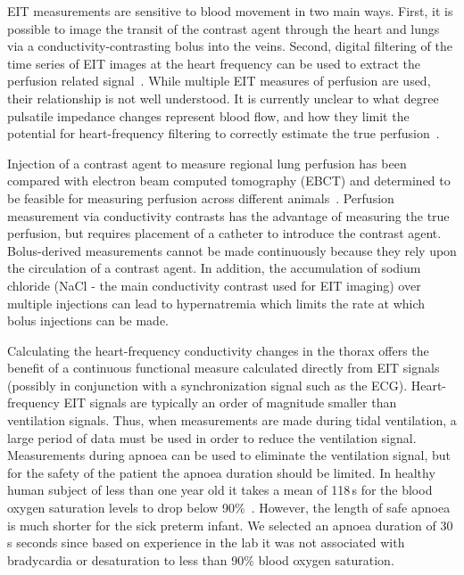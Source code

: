 EIT measurements are sensitive to blood movement in
two main ways. First, it is possible to image the transit of the
contrast agent through the heart and lungs via a conductivity-contrasting
bolus into the veins. Second,
digital filtering of the time series of EIT images at the heart
frequency can be used to extract the perfusion related 
signal~\parencite{leathard_comparison_1994}.
While multiple EIT measures of perfusion are used, their relationship is 
not well understood.
It is currently unclear to what degree pulsatile impedance changes
represent blood flow, and how
they limit the potential for heart-frequency filtering to correctly estimate
the true perfusion~\parencite{nguyen_review_2012}.

Injection of a contrast agent to measure regional lung perfusion has been compared with 
electron beam computed tomography (EBCT) and determined to be feasible 
for measuring perfusion across different animals~\parencite{frerichs_regional_2002}.
Perfusion measurement via conductivity contrasts has the advantage of measuring the true perfusion,
but requires placement of a catheter to 
introduce the contrast agent.
Bolus-derived measurements cannot be made continuously because they rely
upon the circulation of a contrast agent. In addition, 
the accumulation of sodium chloride (NaCl - the main conductivity contrast used for EIT imaging)
over multiple injections
can lead to hypernatremia which limits the rate at which bolus
injections can be made.
 
Calculating the heart-frequency conductivity 
changes in the thorax offers the benefit of a continuous functional
measure calculated directly from EIT signals (possibly
in conjunction with a synchronization signal such as the ECG).
Heart-frequency EIT signals are typically an order of magnitude smaller than
ventilation signals. Thus, when measurements are made during
tidal ventilation, a large period of data must be used
in order to reduce the ventilation signal. 
Measurements during apnoea can be used to eliminate the ventilation signal,
but for the safety of the patient the apnoea duration should be limited.
In healthy human subject of less than one year old it 
takes a mean of 118\,s 
for the blood oxygen saturation levels to drop below
90\%~\parencite{fu_study_1996}. However,
the length of safe apnoea is much shorter for the sick preterm infant.
We selected an apnoea duration of 
30\,s seconds since based on experience in the lab it was
not associated with bradycardia or desaturation to less than 90\% blood oxygen saturation.

